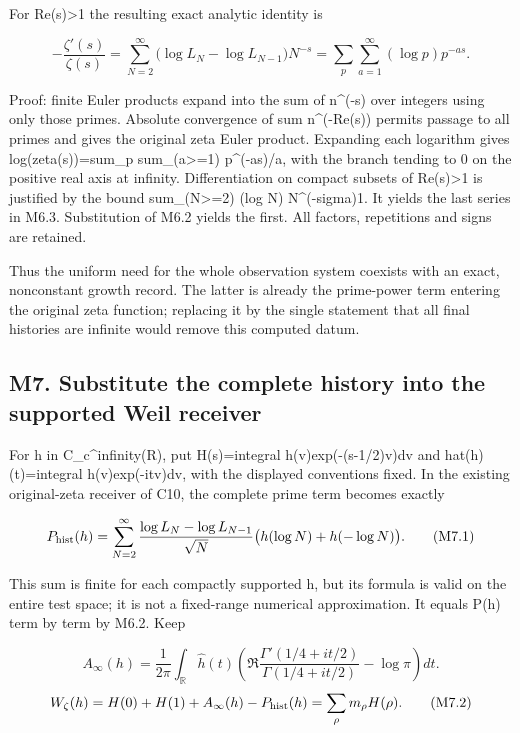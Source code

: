 For Re(s)\textgreater1 the resulting exact analytic identity is

\[
\boxed{-\frac{\zeta'(s)}{\zeta(s)}
=\sum_{N=2}^{\infty}
\bigl(\log L_N-\log L_{N-1}\bigr)N^{-s}
=\sum_p\sum_{a=1}^{\infty}(\log p)p^{-as}.}
\tag{M6.3}
\]

Proof: finite Euler products expand into the sum of n\^{}(-s) over
integers using only those primes. Absolute convergence of sum
n\^{}(-Re(s)) permits passage to all primes and gives the original zeta
Euler product. Expanding each logarithm gives log(zeta(s))=sum\_p
sum\_(a\textgreater=1) p\^{}(-as)/a, with the branch tending to 0 on the
positive real axis at infinity. Differentiation on compact subsets of
Re(s)\textgreater1 is justified by the bound sum\_(N\textgreater=2) (log
N) N\^{}(-sigma)1. It yields the last series in M6.3. Substitution of
M6.2 yields the first. All factors, repetitions and signs are retained.

Thus the uniform need for the whole observation system coexists with an
exact, nonconstant growth record. The latter is already the prime-power
term entering the original zeta function; replacing it by the single
statement that all final histories are infinite would remove this
computed datum.

\subsection{M7. Substitute the complete history into the supported Weil
receiver}\label{m7.-substitute-the-complete-history-into-the-supported-weil-receiver}

For h in C\_c\^{}infinity(R), put H(s)=integral h(v)exp(-(s-1/2)v)dv and
hat(h)(t)=integral h(v)exp(-itv)dv, with the displayed conventions
fixed. In the existing original-zeta receiver of C10, the complete prime
term becomes exactly

\[
P_{\rm hist}(h)=\sum_{N=2}^{\infty}
\frac{\log L_N-\log L_{N-1}}{\sqrt N}
\bigl(h(\log N)+h(-\log N)\bigr).
\tag{M7.1}
\]

This sum is finite for each compactly supported h, but its formula is
valid on the entire test space; it is not a fixed-range numerical
approximation. It equals P(h) term by term by M6.2. Keep

\[
A_\infty(h)=\frac1{2\pi}\int_{\mathbb R}\widehat h(t)
\left(\Re\frac{\Gamma'(1/4+it/2)}{\Gamma(1/4+it/2)}-\log\pi\right)dt.
\] \[
W_\zeta(h)=H(0)+H(1)+A_\infty(h)-P_{\rm hist}(h)
=\sum_\rho m_\rho H(\rho).
\tag{M7.2}
\]

